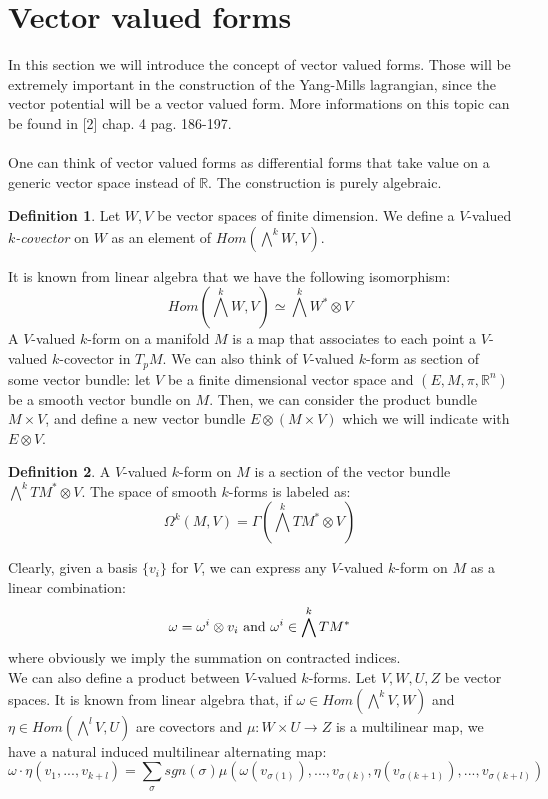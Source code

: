 \documentclass[12pt,a4paper]{report}
\theoremstyle{definition}
\newtheorem{Def}{Definition}[chapter]
\theoremstyle{Theorem}
\theoremstyle{definition}
\theoremstyle{definition}
\begin{document}
	\section{Vector valued forms}
	In this section we will introduce the concept of vector valued forms. Those will be extremely important in the construction of the Yang-Mills lagrangian, since the vector potential will be a vector valued form. More informations on this topic can be found in [2] chap. 4 pag. 186-197.
	\\\\
	One can think of vector valued forms as differential forms that take value on a generic vector space instead of $\mathbb{R}$. The construction is purely algebraic.
	\begin{Def}
		Let $W,V$ be vector spaces of finite dimension. We define a $V$-valued \textit{$k$-covector} on $W$ as an element of $Hom(\bigwedge^k W,V)$.
	\end{Def}
	It is known from linear algebra that we have the following isomorphism:
	$$Hom(\bigwedge^k W,V)\simeq \bigwedge^k W^*\otimes V$$
	A $V$-valued $k$-form on a manifold $M$ is a map that associates to each point a $V$-valued $k$-covector in $T_pM$. We can also think of $V$-valued $k$-form as section of some vector bundle: let $V$ be a finite dimensional vector space and $(E,M,\pi,\mathbb{R}^n)$ be a smooth vector bundle on $M$. Then, we can consider the product bundle $M\times V$, and define a new vector bundle $E\otimes (M\times V)$ which we will indicate with $E\otimes V$.
	\begin{Def}
		A $V$-valued $k$-form on $M$ is a section of the vector bundle $\bigwedge^k TM^*\otimes V$. The space of smooth $k$-forms is labeled as:
		$$\Omega^k(M,V)=\Gamma(\bigwedge^k TM^*\otimes V)$$
	\end{Def}
	Clearly, given a basis $\{v_i\}$ for $V$, we can express any $V$-valued $k$-form on $M$ as a linear combination:
	$$\omega=\omega^i\otimes v_i \hbox{ and } \omega^i\in \bigwedge^k TM^*$$
	where obviously we imply the summation on contracted indices. \\
	We can also define a product between $V$-valued $k$-forms. Let $V,W,U,Z$ be vector spaces. It is known from linear algebra that, if $\omega\in Hom(\bigwedge^kV,W)$ and $\eta\in Hom(\bigwedge^lV,U)$ are covectors and $\mu:W\times U\rightarrow Z$ is a multilinear map, we have a natural induced multilinear alternating map:
	$$\omega\cdot \eta(v_1,...,v_{k+l})=\sum_\sigma sgn(\sigma)\mu(\omega(v_{\sigma(1)}),...,v_{\sigma(k)},\eta(v_{\sigma(k+1)}),...,v_{\sigma(k+l)})$$
\end{document}
